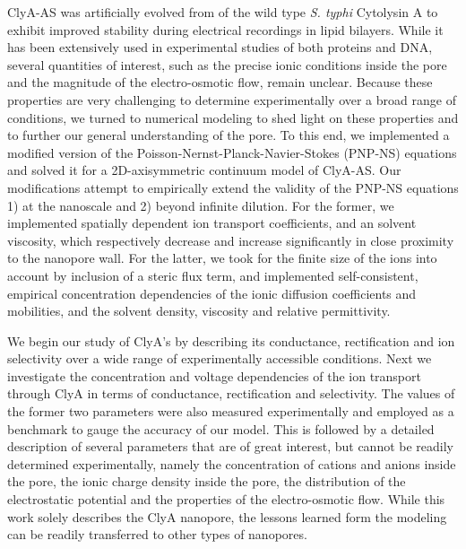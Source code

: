 \documentclass[journal=ancac3,manuscript=article,etalmode=truncate,maxauthors=0,layout=twocolumn]{achemso}
\begin{document}
ClyA-AS was artificially evolved from of the wild type \textit{S. typhi} Cytolysin A to exhibit improved
stability during electrical recordings in lipid bilayers.\cite{Soskine-2013} While it has been extensively
used in experimental studies of both proteins\cite{Soskine-2013,VanMeervelt-2014,Soskine-Biesemans-2015,
Biesemans-Soskine-2015,Wloka-2017,VanMeervelt-2017} and DNA,\cite{Franceschini-2013,Franceschini-2016}
several quantities of interest, such as the precise ionic conditions inside the pore and the magnitude of the
electro-osmotic flow, remain unclear. Because these properties are very challenging to determine
experimentally over a broad range of conditions, we turned to numerical modeling to shed light on these
properties and to further our general understanding of the pore.
To this end, we implemented a modified version of the Poisson-Nernst-Planck-Navier-Stokes (PNP-NS) equations
and solved it for a 2D-axisymmetric continuum model of ClyA-AS. Our modifications attempt to empirically
extend the validity of the PNP-NS equations 1) at the nanoscale and 2) beyond infinite dilution. For the
former, we  implemented spatially dependent ion transport coefficients,\cite{Makarov-1998, Simakov-2010} and
an solvent viscosity\cite{Pronk-2014,Hsu-2017}, which respectively decrease and increase significantly in
close proximity to the nanopore wall. For the latter, we took for the finite size of the ions into account by
inclusion of a steric flux term,\cite{Lu-2011} and implemented self-consistent, empirical concentration
dependencies of the ionic diffusion coefficients and mobilities,\cite{Baldessari-2008-1} and the solvent
density,\cite{} viscosity and relative permittivity.\cite{Gavish-2016}

We begin our study of ClyA's by describing its conductance, rectification and ion selectivity over a wide
range of experimentally accessible conditions. Next we investigate the concentration and voltage dependencies
of the ion transport through ClyA in
terms of conductance, rectification and selectivity. The values of the former two parameters were also
measured experimentally and employed as a benchmark to gauge the accuracy of our model. This is followed by a
detailed description of several parameters that are of great interest, but cannot be readily determined
experimentally, namely the concentration of cations and anions inside the pore, the ionic charge density
inside the pore, the distribution of the electrostatic potential and the properties of the electro-osmotic
flow. While this work solely describes the ClyA nanopore, the lessons learned form the modeling can be
readily transferred to other types of nanopores.
\end{document}

